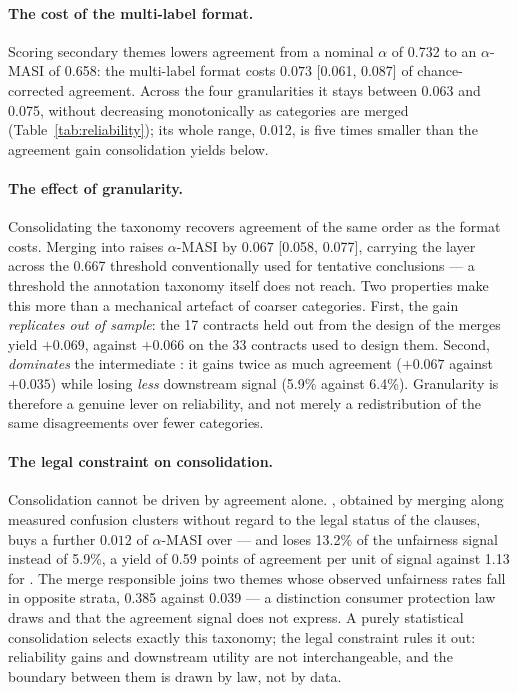 

\paragraph{The cost of the multi-label format.}
Scoring secondary themes lowers agreement from a nominal $\alpha$ of 0.732 to an
$\alpha$-MASI of 0.658: the multi-label format costs $0.073$ [0.061, 0.087] of
chance-corrected agreement. Across the four granularities it stays between 0.063 and
0.075, without decreasing monotonically as categories are merged
(Table~\ref{tab:reliability}); its whole range, 0.012, is five times smaller than
the agreement gain consolidation yields below.

\paragraph{The effect of granularity.}
Consolidating the taxonomy recovers agreement of the same order as the format
costs. Merging  into  raises $\alpha$-MASI by $0.067$ [0.058, 0.077],
carrying the layer across the 0.667 threshold conventionally used for tentative
conclusions \cite{passonneau2006masi} --- a threshold the annotation taxonomy
itself does not reach. Two properties make this more than a mechanical artefact
of coarser categories. First, the gain \emph{replicates out of sample}: the
17 contracts held out from the design of the merges yield $+0.069$, against
$+0.066$ on the 33 contracts used to design them. Second,  \emph{dominates}
the intermediate : it gains twice as much agreement ($+0.067$ against
$+0.035$) while losing \emph{less} downstream signal (5.9\% against 6.4\%).
Granularity is therefore a genuine lever on reliability, and not merely a
redistribution of the same disagreements over fewer categories.

\paragraph{The legal constraint on consolidation.}
Consolidation cannot be driven by agreement alone. , obtained by merging
along measured confusion clusters without regard to the legal status of the
clauses, buys a further $0.012$ of $\alpha$-MASI over  --- and loses
13.2\% of the unfairness signal instead of 5.9\%, a yield of 0.59 points of
agreement per unit of signal against 1.13 for . The merge responsible joins two
themes whose observed unfairness rates fall in opposite strata, 0.385 against
0.039 --- a distinction consumer protection law draws
\cite{eu1993directive,micklitz2017empire} and that the agreement signal does not
express. A purely statistical consolidation selects exactly this taxonomy;
the legal constraint rules it out: reliability gains and downstream utility are
not interchangeable, and the boundary between them is drawn by law, not by data.

